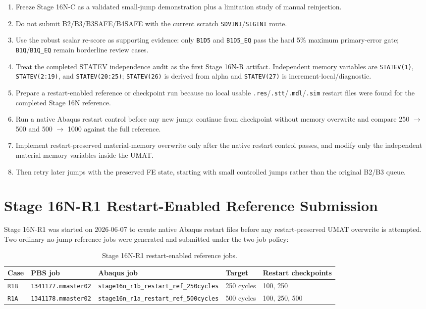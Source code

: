 \documentclass[11pt,a4paper]{article}
\newcommand{\code}[1]{\texttt{#1}}
\begin{document}
\begin{enumerate}
  \item Freeze Stage 16N-C as a validated small-jump demonstration plus a limitation study of manual reinjection.
  \item Do not submit B2/B3/B3SAFE/B4SAFE with the current scratch \code{SDVINI}/\code{SIGINI} route.
  \item Use the robust scalar re-score as supporting evidence: only \code{B1D5} and \code{B1D5\_EQ} pass the hard 5\% maximum primary-error gate; \code{B1Q}/\code{B1Q\_EQ} remain borderline review cases.
  \item Treat the completed STATEV independence audit as the first Stage 16N-R artifact. Independent memory variables are \code{STATEV(1)}, \code{STATEV(2:19)}, and \code{STATEV(20:25)}; \code{STATEV(26)} is derived from alpha and \code{STATEV(27)} is increment-local/diagnostic.
  \item Prepare a restart-enabled reference or checkpoint run because no local usable \code{.res}/\code{.stt}/\code{.mdl}/\code{.sim} restart files were found for the completed Stage 16N reference.
  \item Run a native Abaqus restart control before any new jump: continue from checkpoint without memory overwrite and compare 250 $\rightarrow$ 500 and 500 $\rightarrow$ 1000 against the full reference.
  \item Implement restart-preserved material-memory overwrite only after the native restart control passes, and modify only the independent material memory variables inside the UMAT.
  \item Then retry later jumps with the preserved FE state, starting with small controlled jumps rather than the original B2/B3 queue.
\end{enumerate}

\section{Stage 16N-R1 Restart-Enabled Reference Submission}

Stage 16N-R1 was started on 2026-06-07 to create native Abaqus restart files before any restart-preserved UMAT overwrite is attempted. Two ordinary no-jump reference jobs were generated and submitted under the two-job policy:

\begin{table}[H]
\centering
\caption{Stage 16N-R1 restart-enabled reference jobs.}
\begin{tabular}{lllll}
\toprule
Case & PBS job & Abaqus job & Target & Restart checkpoints \\
\midrule
\code{R1B} & \code{1341177.mmaster02} & \code{stage16n\_r1b\_restart\_ref\_250cycles} & 250 cycles & 100, 250 \\
\code{R1A} & \code{1341178.mmaster02} & \code{stage16n\_r1a\_restart\_ref\_500cycles} & 500 cycles & 100, 250, 500 \\
\bottomrule
\end{tabular}
\end{table}
\end{document}
